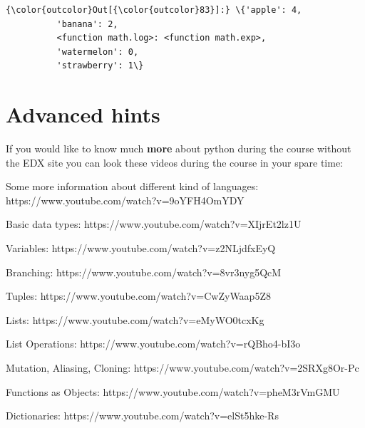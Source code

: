 \documentclass[11pt]{article}
\begin{document}
\begin{Verbatim}[commandchars=\\\{\}]
{\color{outcolor}Out[{\color{outcolor}83}]:} \{'apple': 4,
          'banana': 2,
          <function math.log>: <function math.exp>,
          'watermelon': 0,
          'strawberry': 1\}
\end{Verbatim}
            
    \hypertarget{advanced-hints}{%
\section{Advanced hints}\label{advanced-hints}}

If you would like to know much \textbf{more} about python during the
course without the EDX site you can look these videos during the course
in your spare time:

Some more information about different kind of languages:
https://www.youtube.com/watch?v=9oYFH4OmYDY

Basic data types: https://www.youtube.com/watch?v=XIjrEt2lz1U

Variables: https://www.youtube.com/watch?v=z2NLjdfxEyQ

Branching: https://www.youtube.com/watch?v=8vr3nyg5QcM

Tuples: https://www.youtube.com/watch?v=CwZyWaap5Z8

Lists: https://www.youtube.com/watch?v=eMyWO0tcxKg

List Operations: https://www.youtube.com/watch?v=rQBho4-bI3o

Mutation, Aliasing, Cloning: https://www.youtube.com/watch?v=2SRXg8Or-Pc

Functions as Objects: https://www.youtube.com/watch?v=pheM3rVmGMU

Dictionaries: https://www.youtube.com/watch?v=elSt5hke-Rs


    
    
    
    
\end{document}
